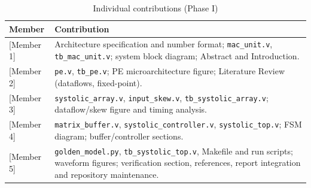 \documentclass[conference]{IEEEtran}
\begin{document}
\begin{table}[h]
\centering
\caption{Individual contributions (Phase I)}
\label{tab:contrib}
\setlength{\tabcolsep}{3pt}
\begin{tabular}{@{}p{1.7cm}p{6.1cm}@{}}
\toprule
\textbf{Member} & \textbf{Contribution} \\
\midrule
{[Member 1]} & Architecture specification and number format; \texttt{mac\_unit.v}, \texttt{tb\_mac\_unit.v}; system block diagram; Abstract and Introduction. \\
{[Member 2]} & \texttt{pe.v}, \texttt{tb\_pe.v}; PE microarchitecture figure; Literature Review (dataflows, fixed-point). \\
{[Member 3]} & \texttt{systolic\_array.v}, \texttt{input\_skew.v}, \texttt{tb\_systolic\_array.v}; dataflow/skew figure and timing analysis. \\
{[Member 4]} & \texttt{matrix\_buffer.v}, \texttt{systolic\_controller.v}, \texttt{systolic\_top.v}; FSM diagram; buffer/controller sections. \\
{[Member 5]} & \texttt{golden\_model.py}, \texttt{tb\_systolic\_top.v}, Makefile and run scripts; waveform figures; verification section, references, report integration and repository maintenance. \\
\bottomrule
\end{tabular}
\end{table}
\end{document}
